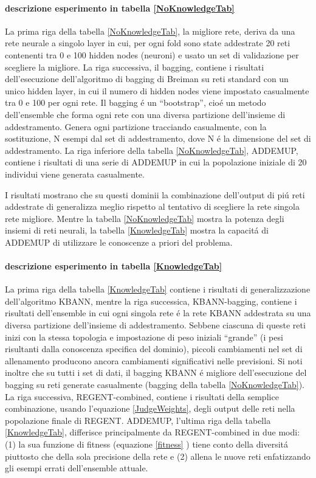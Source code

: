 \documentclass[a4paper,12pt]{report}
\begin{document}
  \paragraph{descrizione esperimento in tabella \ref{NoKnowledgeTab}}
  La prima riga della tabella \ref{NoKnowledgeTab}, la migliore rete, deriva da una rete neurale a singolo layer in cui, per ogni fold sono state addestrate 20 reti contenenti tra 0 e 100 hidden nodes (neuroni) e usato un set di validazione per scegliere la migliore. 
  La riga successiva, il bagging, contiene i risultati dell'esecuzione dell'algoritmo di bagging di Breiman \cite{breiman1994bagging} su reti standard con un unico hidden layer, in cui il numero di hidden nodes viene impostato casualmente tra 0 e 100 per ogni rete. 
  Il bagging \'e un ``bootstrap'', cio\'e un metodo dell'ensemble che forma ogni rete con una diversa partizione dell'insieme di addestramento. 
  Genera ogni partizione tracciando casualmente, con la sostituzione, N esempi dal set di addestramento, dove N \'e la dimensione del set di addestramento. 
  La riga inferiore della tabella \ref{NoKnowledgeTab}, ADDEMUP, contiene i risultati di una serie di ADDEMUP in cui la popolazione iniziale di 20 individui viene generata casualmente. 
  
  I risultati mostrano che su questi dominii la combinazione dell'output di pi\'u reti addestrate di generalizza meglio rispetto al tentativo di scegliere la rete singola rete migliore. 
  Mentre la tabella \ref{NoKnowledgeTab} mostra la potenza degli insiemi di reti neurali, la tabella \ref{KnowledgeTab} mostra la capacit\'a di ADDEMUP di utilizzare le conoscenze a priori del problema. 
  
  \paragraph{descrizione esperimento in tabella \ref{KnowledgeTab}}
  La prima riga della tabella \ref{KnowledgeTab} contiene i risultati di generalizzazione dell'algoritmo KBANN, mentre la riga successica, KBANN-bagging, contiene i risultati dell'ensemble in cui ogni singola rete \'e la rete KBANN addestrata su una diversa partizione dell'insieme di addestramento. 
  Sebbene ciascuna di queste reti inizi con la stessa topologia e impostazione di peso iniziali ``grande'' (i pesi risultanti dalla conoscenza specifica del dominio), piccoli cambiamenti nel set di allenamento producono ancora cambiamenti significativi nelle previsioni. 
  Si noti inoltre che su tutti i set di dati, il bagging KBANN \'e migliore dell'esecuzione del bagging su reti generate casualmente (bagging della tabella \ref{NoKnowledgeTab}). 
  La riga successiva, REGENT-combined, contiene i risultati della semplice combinazione, usando l'equazione \ref{JudgeWeights}, degli output delle reti nella popolazione finale di REGENT. 
  ADDEMUP, l'ultima riga della tabella \ref{KnowledgeTab}, differisce principalmente da REGENT-combined in due modi: (1) la sua funzione di fitness (equazione \ref{fitness} ) tiene conto della diversit\'a piuttosto che della sola precisione della rete e (2) allena le nuove reti enfatizzando gli esempi errati dell'ensemble attuale. 
  
\end{document}
